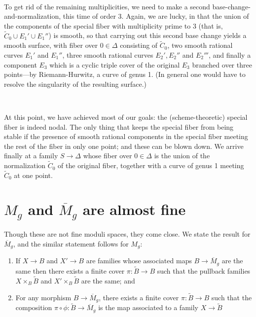 \

To get rid of the remaining multiplicities, we need to make a second base-change-and-normalization, this time of order 3. Again, we are lucky, in that the union of the components of the special fiber with multiplicity prime to 3 (that is, $\tilde C_0 \cup E_1' \cup E_1''$) is smooth, so that carrying out this second base change yields a smooth surface, with fiber over $0 \in \Delta$ consisting of $\tilde C_0$, two smooth rational curves $E_1'$ and $E_1''$, three smooth rational curves $E_2', E_2''$ and $E_2'''$, and finally a component $E_3$ which is a cyclic triple cover of the original $E_3$ branched over three points---by Riemann-Hurwitz, a curve of genus 1. (In general one would have to resolve the singularity of the resulting surface.)

\

At this point, we have achieved most of our goals: the (scheme-theoretic) special fiber is indeed nodal. The only thing that keeps the special fiber from being stable if the presence of smooth rational components in the special fiber meeting the rest of the fiber in only one point; and these can be blown down. We arrive finally at a family $S \to \Delta$ whose fiber over $0 \in \Delta$ is the union of the normalization $\tilde C_0$ of the original fiber, together with a curve of genus 1 meeting $\tilde C_0$ at one point.

\section{$M_g$ and $\overline M_g$ are almost fine}\label{almost fine}

Though these are not fine moduli spaces, they come close. We state the result for $\overline M_g$, and the similar statement follows for $M_g$:

\begin{fact}
\begin{enumerate}
\item If $X \to B$ and $X' \to B$ are families whose associated maps $B \to \overline M_g$ are the same then there exists a finite cover $\pi : \tilde B \to B$ such that the pullback families $X \times_B \tilde B$ and $X' \times_B \tilde B$ are the same; and
\item For any morphism $B \to \overline M_g$, there exists a finite cover $\pi : \tilde B \to B$ such that the composition $\pi \circ \phi : \tilde B \to \overline M_g$ is the map associated to a family $X \to \tilde B$
\end{enumerate}
\end{fact}

